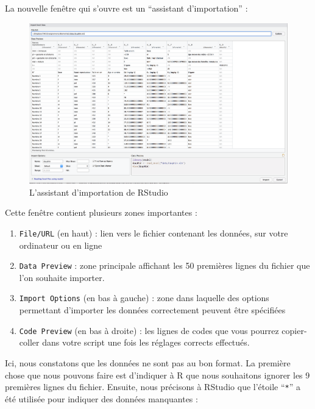 \documentclass[a4paperpaper,]{article}
\providecommand{\tightlist}{%
  \setlength{\itemsep}{0pt}\setlength{\parskip}{0pt}}
\theoremstyle{definition}
\theoremstyle{definition}
\theoremstyle{definition}
\theoremstyle{remark}
\begin{document}
La nouvelle fenêtre qui s'ouvre est un ``assistant d'importation'' :

\begin{figure}[htpb]

{\centering \includegraphics[width=1\linewidth]{images/import2} 

}

\caption{L'assistant d'importation de RStudio}\label{fig:import2}
\end{figure}

Cette fenêtre contient plusieurs zones importantes :

\begin{enumerate}
\def\labelenumi{\arabic{enumi}.}
\tightlist
\item
  \texttt{File/URL} (en haut) : lien vers le fichier contenant les
  données, sur votre ordinateur ou en ligne
\item
  \texttt{Data\ Preview} : zone principale affichant les 50 premières
  lignes du fichier que l'on souhaite importer.
\item
  \texttt{Import\ Options} (en bas à gauche) : zone dans laquelle des
  options permettant d'importer les données correctement peuvent être
  spécifiées
\item
  \texttt{Code\ Preview} (en bas à droite) : les lignes de codes que
  vous pourrez copier-coller dans votre script une fois les réglages
  corrects effectués.
\end{enumerate}

Ici, nous constatons que les données ne sont pas au bon format. La
première chose que nous pouvons faire est d'indiquer à R que nous
souhaitons ignorer les 9 premières lignes du fichier. Ensuite, nous
précisons à RStudio que l'étoile ``\texttt{*}'' a été utilisée pour
indiquer des données manquantes :
\end{document}
